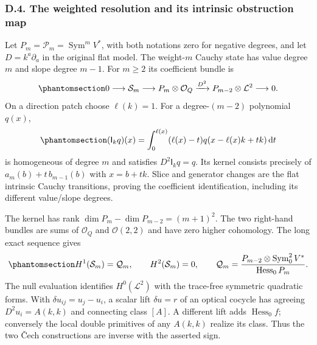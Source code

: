 \documentclass[
  english,
  11pt,
  reqno]{amsart}
\begin{document}
\subsubsection{D.4. The weighted resolution and its intrinsic
obstruction
map}\label{d.4.-the-weighted-resolution-and-its-intrinsic-obstruction-map}

Let \(P_m=\mathcal P_m=\operatorname{Sym}^mV^*\), with both notations
zero for negative degrees, and let \(D=k^a\partial_a\) in the original
flat model. The weight-\(m\) Cauchy state has value degree \(m\) and
slope degree \(m-1\). For \(m\ge2\) its coefficient bundle is
\begin{equation}\protect\phantomsection\label{eq:gg-app-weighted-resolution}{
 0\longrightarrow\mathcal S_m
 \longrightarrow P_m\otimes\mathcal O_Q
 \xrightarrow{D^2}P_{m-2}\otimes\mathcal L^2
 \longrightarrow0 .
}\end{equation} On a direction patch choose \(\ell(k)=1\). For a
degree-\((m-2)\) polynomial \(q(x)\),
\begin{equation}\protect\phantomsection\label{eq:gg-app-double-primitive}{
 (\mathsf I_kq)(x)=
       \int_0^{\ell(x)}(\ell(x)-t)
                    q(x-\ell(x)k+tk)\,\mathrm dt
}\end{equation} is homogeneous of degree \(m\) and satisfies
\(D^2\mathsf I_kq=q\). Its kernel consists precisely of
\(a_m(b)+t\,b_{m-1}(b)\) with \(x=b+tk\). Slice and generator changes
are the flat intrinsic Cauchy transitions, proving the coefficient
identification, including its different value/slope degrees.

The kernel has rank \(\dim P_m-\dim P_{m-2}=(m+1)^2\). The two
right-hand bundles are sums of \(\mathcal O_Q\) and \(\mathcal O(2,2)\)
and have zero higher cohomology. The long exact sequence gives
\begin{equation}\protect\phantomsection\label{eq:gg-app-hessian-quotient}{
 H^1(\mathcal S_m)=\mathcal Q_m,\qquad H^2(\mathcal S_m)=0,
 \qquad
 \mathcal Q_m=
 \frac{P_{m-2}\otimes\operatorname{Sym}^2_0V^*}
      {\operatorname{Hess}_0P_m}.
}\end{equation} The null evaluation identifies \(H^0(\mathcal L^2)\)
with the trace-free symmetric quadratic forms. With
\(\delta u_{ij}=u_j-u_i\), a scalar lift \(\delta u=r\) of an optical
cocycle has agreeing \(D^2u_i=A(k,k)\) and connecting class \([A]\). A
different lift adds \(\operatorname{Hess}_0f\); conversely the local
double primitives of any \(A(k,k)\) realize its class. Thus the two Čech
constructions are inverse with the asserted sign.
\end{document}
